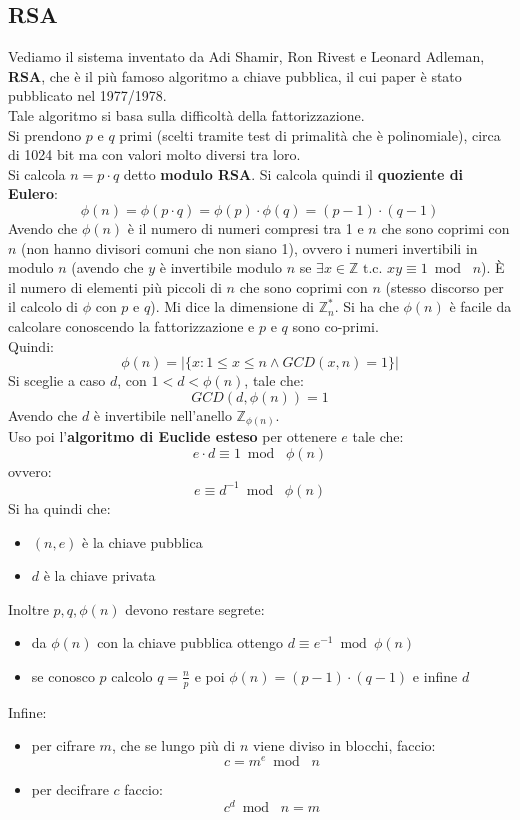 \documentclass[a4paper,12pt, oneside]{book}
\begin{document}
\subsection{RSA}
Vediamo il sistema inventato da Adi Shamir, Ron Rivest e Leonard Adleman,
\textbf{RSA}, che è il più famoso algoritmo a chiave pubblica, il cui paper è
stato pubblicato nel 1977/1978.\\
Tale algoritmo si basa sulla difficoltà della fattorizzazione.\\
Si prendono $p$ e $q$ primi (scelti tramite test di primalità che è
polinomiale), circa di 1024 bit ma con valori molto 
diversi tra loro.\\
Si calcola $n=p\cdot q$ detto \textbf{modulo RSA}. Si calcola quindi il
\textbf{quoziente di Eulero}:
\[\phi(n)=\phi(p\cdot q)=\phi(p)\cdot \phi(q)=(p-1)\cdot (q-1)\]
Avendo che $\phi(n)$ è il numero di numeri compresi tra 1 e $n$ che sono coprimi
con $n$ (non hanno divisori comuni che non siano 1), ovvero i numeri invertibili
in modulo $n$ (avendo che $y$ è invertibile modulo $n$ se $\exists
x\in\mathbb{Z}\mbox{ t.c. }xy\equiv 1\bmod\,\,n$). È il numero di elementi più 
piccoli di $n$ che sono coprimi con $n$ (stesso discorso per il calcolo di
$\phi$ con $p$ e $q$). Mi dice la dimensione di
$\mathbb{Z}_{n}^*$.
Si ha che $\phi(n)$ è facile da calcolare conoscendo la fattorizzazione e $p$ e
$q$ sono co-primi.\\
Quindi:
\[\phi(n)=|\{x:1\leq x\leq n\land GCD(x,n)=1\}|\]
Si sceglie a caso $d$, con $1<d<\phi(n)$, tale che:
\[GCD(d,\phi(n))=1\]
Avendo che $d$ è invertibile nell'anello $\mathbb{Z}_{\phi(n)}$.\\
Uso poi l'\textbf{algoritmo di Euclide esteso} per ottenere $e$ tale che:
\[e\cdot d\equiv 1\bmod \,\,\phi(n)\]
ovvero:
\[e\equiv d^{-1}\bmod\,\,\phi(n)\]
Si ha quindi che:
\begin{itemize}
  \item $(n,e)$ è la chiave pubblica
  \item $d$ è la chiave privata
\end{itemize}
Inoltre $p,q,\phi(n)$ devono restare segrete:
\begin{itemize}
  \item da $\phi(n)$ con la chiave pubblica ottengo $d\equiv e^{-1}\bmod\phi(n)$
  \item se conosco $p$ calcolo $q=\frac{n}{p}$ e poi $\phi(n)=(p-1)\cdot (q-1)$
  e infine $d$
\end{itemize}
Infine:
\begin{itemize}
  \item per cifrare $m$, che se lungo più di $n$ viene diviso in blocchi, faccio:
  \[c=m^e\bmod\,\,n\]
  \item per decifrare $c$ faccio:
  \[c^d\bmod\,\,n=m\]
\end{itemize}
\end{document}
